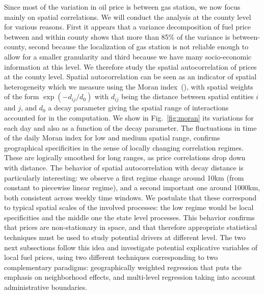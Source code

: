 \documentclass[3p,times,procedia]{elsarticle}
\begin{document}
Since most of the variation in oil price is between gas station, we now focus mainly on spatial correlations. We will conduct the analysis at the county level for various reasons. First it appears that a variance decomposition of fuel price between and within county shows that more than 85\% of the variance is between-county, second because the localization of gas station is not reliable enough to allow for a smaller granularity and third because we have many socio-economic information at this level. We therefore study the spatial autocorrelation of prices at the county level. Spatial autocorrelation can be seen as an indicator of spatial heterogeneity which we measure using the Moran index~(\cite{tsai2005quantifying}), with spatial weights of the form $\exp{\left(-d_{ij} / d_0 \right)}$ with $d_{ij}$ being the distance between spatial entities $i$ and $j$, and $d_0$ a decay parameter giving the spatial range of interactions accounted for in the computation. We show in Fig.~\ref{fig:moran} its variations for each day and also as a function of the decay parameter. 
The fluctuations in time of the daily Moran index for low and medium spatial range, confirms geographical specificities in the sense of locally changing correlation regimes. These are logically smoothed for long ranges, as price correlations drop down with distance. The behavior of spatial autocorrelation with decay distance is particularly interesting: we observe a first regime change around 10km (from constant to piecewise linear regime), and a second important one around 1000km, both consistent across weekly time windows. We postulate that these correspond to typical spatial scales of the involved processes: the low regime would be local specificities and the middle one the state level processes. This behavior confirms that prices are non-stationary in space, and that therefore appropriate statistical techniques must be used to study potential drivers at different level. The two next subsections follow this idea and investigate potential explicative variables of local fuel prices, using two different techniques corresponding to two complementary paradigms: geographically weighted regression that puts the emphasis on neighborhood effects, and multi-level regression taking into account administrative boundaries.
\end{document}
